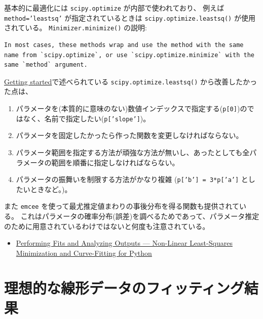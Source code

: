 \documentclass[a4paper, 8pt, notitlepage, uplatex, dvipdfmx]{jsarticle}
\begin{document}
基本的に最適化には \texttt{scipy.optimize} が内部で使われており、 例えば \texttt{method='leastsq'} が指定されているときは \texttt{scipy.optimize.leastsq()} が使用されている。
\texttt{Minimizer.minimize()} の説明:
\begin{verbatim}
In most cases, these methods wrap and use the method with the same name from `scipy.optimize`, or use `scipy.optimize.minimize` with the same `method` argument.
\end{verbatim}

\href{https://lmfit.github.io/lmfit-py/intro.html}{Getting started}で述べられている \texttt{scipy.optimize.leastsq()} から改善したかった点は、
\begin{enumerate}
\item パラメータを(本質的に意味のない)数値インデックスで指定する(\texttt{p[0]})のではなく、名前で指定したい(\texttt{p['slope']})。
\item パラメータを固定したかったら作った関数を変更しなければならない。
\item パラメータ範囲を指定する方法が頑強な方法が無いし、あったとしても全パラメータの範囲を順番に指定しなければならない。
\item パラメータの振舞いを制限する方法がかなり複雑 (\texttt{p['b'] = 3*p['a']} としたいときなど。)。
\end{enumerate}

また \texttt{emcee} を使って最尤推定値まわりの事後分布を得る関数も提供されている。
これはパラメータの確率分布(誤差)を調べるためであって、パラメータ推定のために用意されているわけではないと何度も注意されている。
\begin{itemize}
\item \href{https://lmfit.github.io/lmfit-py/fitting.html\#minimizer-emcee-calculating-the-posterior-probability-distribution-of-parameters}{Performing Fits and Analyzing Outputs — Non-Linear Least-Squares Minimization and Curve-Fitting for Python}
\end{itemize}
\section{理想的な線形データのフィッティング結果}
\label{sec:org35c8a2e}
\end{document}
